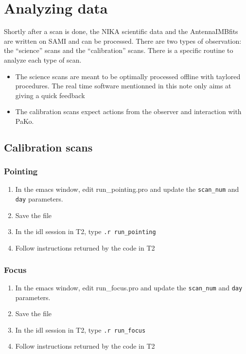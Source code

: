 \documentclass[a4paper,10pt]{article}
\begin{document}
\section{Analyzing data}

Shortly after a scan is done, the NIKA scientific data and the AntennaIMBfits
are written on SAMI and can be processed. There are two types of observation:
the ``science'' scans and the ``calibration'' scans. There is a specific routine
to analyze each type of scan.

\begin{itemize}
\item The science scans are meant
  to be optimally processed offline with taylored procedures. The real time
  software mentionned in this note only aims at giving a quick feedback
\item The calibration scans expect actions from the observer and interaction with
  PaKo.
\end{itemize}

\subsection{Calibration scans}

\subsubsection{Pointing}

\begin{enumerate}
\item In the emacs window, edit run\_pointing.pro and update the {\tt scan\_num}
  and {\tt day} parameters.
\item Save the file
\item In the idl session in T2, type {\tt .r run\_pointing}
\item Follow instructions returned by the code in T2
\end{enumerate}

\subsubsection{Focus}

\begin{enumerate}
\item In the emacs window, edit run\_focus.pro and update the {\tt scan\_num}
  and {\tt day} parameters.
\item Save the file
\item In the idl session in T2, type {\tt .r run\_focus}
\item Follow instructions returned by the code in T2
\end{enumerate}
\end{document}
